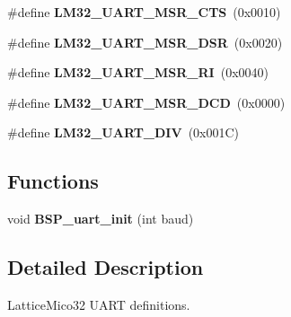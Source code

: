\begin{DoxyCompactItemize}
\mbox{\label{group__lm32__uart_gaadfd9ee7eca13e18519d8dde4213fce6}} 
\#define {\bfseries L\+M32\+\_\+\+U\+A\+R\+T\+\_\+\+M\+S\+R\+\_\+\+C\+TS}~(0x0010)
\item 
\mbox{\label{group__lm32__uart_gad3792795eae563b640ef99d444bd84a8}} 
\#define {\bfseries L\+M32\+\_\+\+U\+A\+R\+T\+\_\+\+M\+S\+R\+\_\+\+D\+SR}~(0x0020)
\item 
\mbox{\label{group__lm32__uart_ga81936a1d57c49d6538d4b521a40faf0f}} 
\#define {\bfseries L\+M32\+\_\+\+U\+A\+R\+T\+\_\+\+M\+S\+R\+\_\+\+RI}~(0x0040)
\item 
\mbox{\label{group__lm32__uart_ga784f883c3a2e577e13eb42a47ed3d684}} 
\#define {\bfseries L\+M32\+\_\+\+U\+A\+R\+T\+\_\+\+M\+S\+R\+\_\+\+D\+CD}~(0x0000)
\item 
\mbox{\label{group__lm32__uart_ga2c182357a0ba6eef7f24008932ca9b8a}} 
\#define {\bfseries L\+M32\+\_\+\+U\+A\+R\+T\+\_\+\+D\+IV}~(0x001\+C)
\end{DoxyCompactItemize}
\subsection*{Functions}
\begin{DoxyCompactItemize}
\item 
\mbox{\label{group__lm32__uart_ga4631d657ae7d189a00ad8fe31cf7d9b4}} 
void {\bfseries B\+S\+P\+\_\+uart\+\_\+init} (int baud)
\end{DoxyCompactItemize}


\subsection{Detailed Description}
Lattice\+Mico32 U\+A\+RT definitions. 

